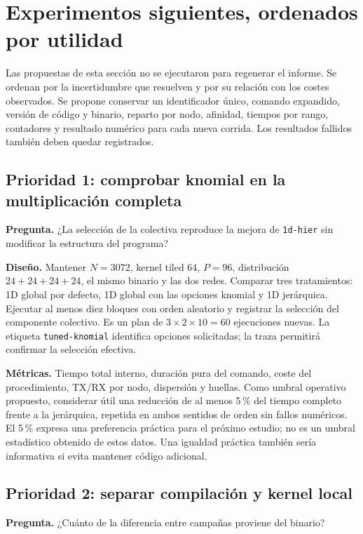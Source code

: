 \section{Experimentos siguientes, ordenados por utilidad}\label{sec:propuestas}

Las propuestas de esta sección no se ejecutaron para regenerar el informe. Se ordenan por la incertidumbre que resuelven y por su relación con los costes observados. Se propone conservar un identificador único, comando expandido, versión de código y binario, reparto por nodo, afinidad, tiempos por rango, contadores y resultado numérico para cada nueva corrida. Los resultados fallidos también deben quedar registrados.

\subsection{Prioridad 1: comprobar knomial en la multiplicación completa}

\textbf{Pregunta.} ¿La selección de la colectiva reproduce la mejora de \texttt{1d-hier} sin modificar la estructura del programa?

\textbf{Diseño.} Mantener $N=3072$, kernel tiled 64, $P=96$, distribución $24+24+24+24$, el mismo binario y las dos redes. Comparar tres tratamientos: 1D global por defecto, 1D global con las opciones knomial y 1D jerárquica. Ejecutar al menos diez bloques con orden aleatorio y registrar la selección del componente colectivo. Es un plan de $3\times2\times10=60$ ejecuciones nuevas. La etiqueta \texttt{tuned-knomial} identifica opciones solicitadas; la traza permitirá confirmar la selección efectiva.

\textbf{Métricas.} Tiempo total interno, duración pura del comando, coste del procedimiento, TX/RX por nodo, dispersión y huellas. Como umbral operativo propuesto, considerar útil una reducción de al menos 5\,\% del tiempo completo frente a la jerárquica, repetida en ambos sentidos de orden sin fallos numéricos. El 5\,\% expresa una preferencia práctica para el próximo estudio; no es un umbral estadístico obtenido de estos datos. Una igualdad práctica también sería informativa si evita mantener código adicional.

\subsection{Prioridad 2: separar compilación y kernel local}

\textbf{Pregunta.} ¿Cuánto de la diferencia entre campañas proviene del binario?


